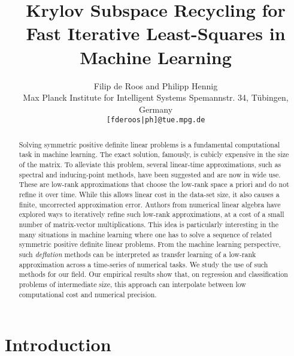 \documentclass{article}
\title{Krylov Subspace Recycling for\\{Fast} Iterative Least-Squares in Machine Learning}
\author{
  Filip de Roos and Philipp Hennig\\
  Max Planck Institute for Intelligent Systems
  Spemannstr. 34, T\"ubingen, Germany\\
  \texttt{[fderoos|ph]@tue.mpg.de}
}
\begin{document}
\maketitle

\begin{abstract}
  Solving symmetric positive definite linear problems is a fundamental computational task in machine learning. The exact solution, famously, is cubicly expensive in the size of the matrix. To alleviate this problem, several linear-time approximations, such as spectral and inducing-point methods, have been suggested and are now in wide use. These are low-rank approximations that choose the low-rank space a priori and do not refine it over time. While this allows linear cost in the data-set size, it also causes a finite, uncorrected approximation error. Authors from numerical linear algebra have explored ways to iteratively refine such low-rank approximations, at a cost of a small number of matrix-vector multiplications. This idea is particularly interesting in the many situations in machine learning where one has to solve a sequence of related symmetric positive definite linear problems. From the machine learning perspective, such \emph{deflation} methods can be interpreted as transfer learning of a low-rank approximation across a time-series of numerical tasks. We study the use of such methods for our field. Our empirical results show that, on regression and classification problems of intermediate size, this approach can interpolate between low computational cost and numerical precision.
\end{abstract}

\section{Introduction}
\label{sec:introduction}
\end{document}
